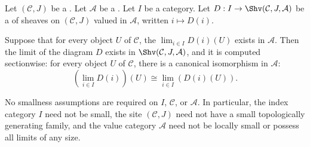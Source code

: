 \begin{theorem}
\label{theorem:limits_of_sheaf_diagrams_on_a_site_valued_in_a_category_are_computed_sectionwise}
Let $(\mathcal{C}, J)$ be a . Let $\mathcal{A}$ be a . Let $I$ be a category. Let $D: I \to \Shv(\mathcal{C}, J, \mathcal{A})$ be a  of sheaves on $(\mathcal{C}, J)$ valued in $\mathcal{A}$, written $i \mapsto D(i)$.

Suppose that for every object $U$ of $\mathcal{C}$, the  $\lim_{i \in I} D(i)(U)$ exists in $\mathcal{A}$. Then the limit of the diagram $D$ exists in $\Shv(\mathcal{C}, J, \mathcal{A})$, and it is computed sectionwise: for every object $U$ of $\mathcal{C}$, there is a canonical isomorphism in $\mathcal{A}$:
\[
\left( \lim_{i \in I} D(i) \right)(U) \cong \lim_{i \in I} (D(i)(U)).
\]

No smallness assumptions are required on $I$, $\mathcal{C}$, or $\mathcal{A}$. In particular, the index category $I$ need not be small, the site $(\mathcal{C}, J)$ need not have a small topologically generating family, and the value category $\mathcal{A}$ need not be locally small or possess all limits of any size.
\end{theorem}

